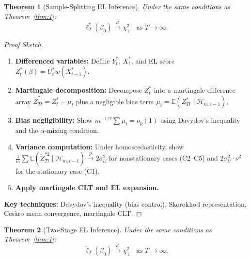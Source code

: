 \documentclass[11pt,a4paper]{article}
\newtheorem{theorem}{Theorem}[section]
\theoremstyle{definition}
\theoremstyle{remark}
\begin{document}
\begin{theorem}[Sample-Splitting EL Inference]\label{thm:2}
Under the same conditions as Theorem~\ref{thm:1}:
\begin{equation}
    \ell_T^*(\beta_0) \xrightarrow{d} \chi^2_1 \quad \text{as } T \to \infty.
\end{equation}
\end{theorem}

\begin{proof}[Proof Sketch]
\begin{enumerate}[leftmargin=*, label=\textbf{\arabic*}.]
    \item \textbf{Differenced variables:}
    Define $Y_t^*$, $X_t^*$, and EL score $Z_t^*(\beta) = U_t^* w(X_{t-1}^*)$.
    \item \textbf{Martingale decomposition:}
    Decompose $Z_t^*$ into a martingale difference array $\check{Z}_{Tt}^* = Z_t^* - \mu_t$
    plus a negligible bias term $\mu_t = \mathbb{E}(Z_{Tt}^* \mid \mathcal{H}_{m,t-1})$.
    \item \textbf{Bias negligibility:}
    Show $m^{-1/2}\sum \mu_t = o_p(1)$ using Davydov's inequality
    and the $\alpha$-mixing condition.
    \item \textbf{Variance computation:}
    Under homoscedasticity, show
    $\frac{1}{m}\sum \mathbb{E}(\check{Z}_{Tt}^{*2} \mid \mathcal{H}_{m,t-1})
    \xrightarrow{p} 2\sigma_U^2$ for nonstationary cases (C2--C5)
    and $2\sigma_U^2 \cdot \nu^2$ for the stationary case (C1).
    \item \textbf{Apply martingale CLT and EL expansion.}
\end{enumerate}
\textbf{Key techniques:} Davydov's inequality (bias control), Skorokhod representation,
Ces\`aro mean convergence, martingale CLT.
\end{proof}

\begin{theorem}[Two-Stage EL Inference]\label{thm:3}
Under the same conditions as Theorem~\ref{thm:1}:
\begin{equation}
    \widetilde{\ell}_T(\beta_0) \xrightarrow{d} \chi^2_1 \quad \text{as } T \to \infty.
\end{equation}
\end{theorem}
\end{document}
